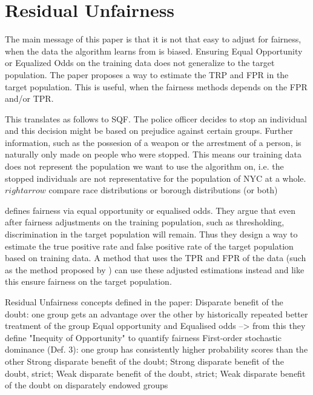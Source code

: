 \section*{Residual Unfairness}
The main message of this paper is that it is not that easy to adjust for fairness, when the data the algorithm learns from is biased. Ensuring Equal Opportunity or Equalized Odds on the training data does not generalize to the target population. The paper proposes a way to estimate the TRP and FPR in the target population. This is useful, when the fairness methods depends on the FPR and/or TPR. 

This translates as follows to SQF. The police officer decides to stop an individual and this decision might be based on prejudice against certain groups. Further information, such as the possesion of a weapon or the arrestment of a person, is naturally only made on people who were stopped.
This means our training data does not represent the population we want to use the algorithm on, i.e. the stopped individuals are not representative for the population of NYC at a whole. $rightarrow$ compare race distributions or borough distributions (or both)

\cite{kallus} defines fairness via equal opportunity or equalised odds. They argue that even after fairness adjustments on the training population, such as thresholding, discrimination in the target population will remain.
Thus they design a way to estimate the true positive rate and false positive rate of the target population based on training data. A method that uses the TPR and FPR of the data (such as the method proposed by \cite{hardt2016}) can use these adjusted estimations instead and like this ensure fairness on the target population.



Residual Unfairness \cite{kallus} concepts defined in the paper:
Disparate benefit of the doubt: one group gets an advantage over the other by historically repeated better treatment of the group
Equal opportunity and Equalised odds --> from this they define "Inequity of Opportunity" to quantify fairness
First-order stochastic dominance (Def. 3): one group has consistently higher probability scores than the other
Strong disparate benefit of the doubt; Strong disparate benefit of the doubt,  strict;
Weak disparate benefit of the doubt, strict; Weak disparate benefit of the doubt on disparately endowed groups

